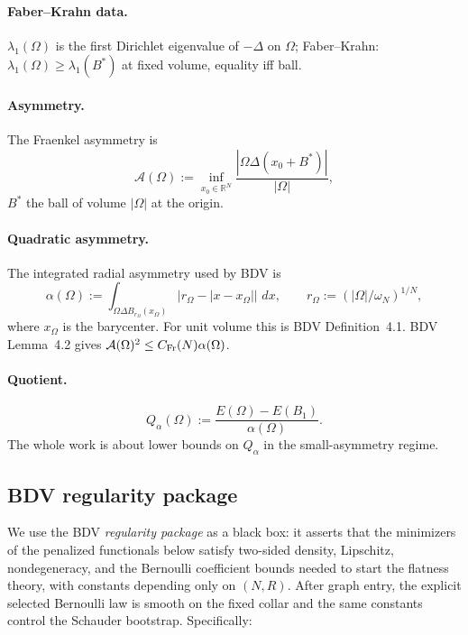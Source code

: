 \documentclass[11pt]{amsart}
\theoremstyle{definition}
\newcommand{\R}{\mathbb R}
\newcommand{\abs}[1]{\left|#1\right|}
\renewcommand{\d}{\,d}
\begin{document}
\paragraph{Faber--Krahn data.}
$\lambda_1(\Omega)$ is the first Dirichlet eigenvalue of $-\Delta$ on
$\Omega$; Faber--Krahn: $\lambda_1(\Omega)\ge\lambda_1(B^*)$ at fixed
volume, equality iff ball.

\paragraph{Asymmetry.}
The Fraenkel asymmetry is
\[
\mathcal A(\Omega):=
\inf_{x_0\in\R^N}\frac{\abs{\Omega\Delta(x_0+B^*)}}{\abs{\Omega}},
\]
$B^*$ the ball of volume $\abs{\Omega}$ at the origin.

\paragraph{Quadratic asymmetry.}
The integrated radial asymmetry used by BDV is
\[
\alpha(\Omega):=
\int_{\Omega\Delta B_{r_\Omega}(x_\Omega)}
\bigl|r_\Omega-\abs{x-x_\Omega}\bigr|\,\d x,
\qquad
r_\Omega:=(\abs{\Omega}/\omega_N)^{1/N},
\]
where $x_\Omega$ is the barycenter. For unit volume this is BDV Definition~4.1.
BDV Lemma~4.2 gives $\mathcal A(\Omega)^2\le C_{\rm Fr}(N)\alpha(\Omega)$.

\paragraph{Quotient.}
\[
Q_\alpha(\Omega):=\frac{E(\Omega)-E(B_1)}{\alpha(\Omega)}.
\]
The whole work is about lower bounds on $Q_\alpha$ in the small-asymmetry regime.

\subsection{BDV regularity package}

We use the BDV \emph{regularity package} as a black box: it asserts that the
minimizers of the penalized functionals below satisfy two-sided density,
Lipschitz, nondegeneracy, and the Bernoulli coefficient bounds needed to start
the flatness theory, with constants depending only on $(N,R)$. After graph
entry, the explicit selected Bernoulli law is smooth on the fixed collar and
the same constants control the Schauder bootstrap. Specifically:
\end{document}

